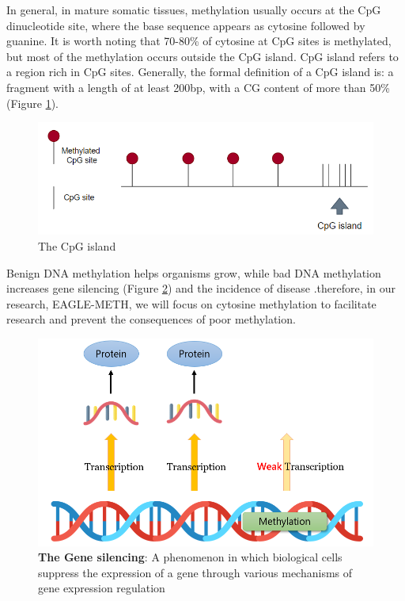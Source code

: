 \documentclass{PHlab-thesis}
\begin{document}
\par In general, in mature somatic tissues, methylation usually occurs at the CpG dinucleotide site, where the base sequence appears as cytosine followed by guanine. It is worth noting that 70-80\% of cytosine at CpG sites is methylated, but most of the methylation occurs outside the CpG island. CpG island refers to a region rich in CpG sites. Generally, the formal definition of a CpG island is: a fragment with a length of at least 200bp, with a CG content of more than 50\% (Figure \ref{fig:CpG_island}).
\vfill
\begin{figure}[h]
  \centering
  \includegraphics[scale=0.8]{figures/CpG_island.PNG}
  \caption{The CpG island}
  \label{fig:CpG_island}
\end{figure}

Benign DNA methylation helps organisms grow, while bad DNA methylation increases gene silencing (Figure \ref{fig:Gene_silencing}) and the incidence of disease .therefore, in our research, EAGLE-METH, we will focus on cytosine methylation to facilitate research and prevent the consequences of poor methylation.

\begin{figure}[h]
  \centering
  \includegraphics[scale=0.8]{figures/Gene_silencing.PNG}
  \caption{\textbf{The Gene silencing}: A phenomenon in which biological cells suppress the expression of a gene through various mechanisms of gene expression regulation}
  \label{fig:Gene_silencing}
\end{figure}
\end{document}
